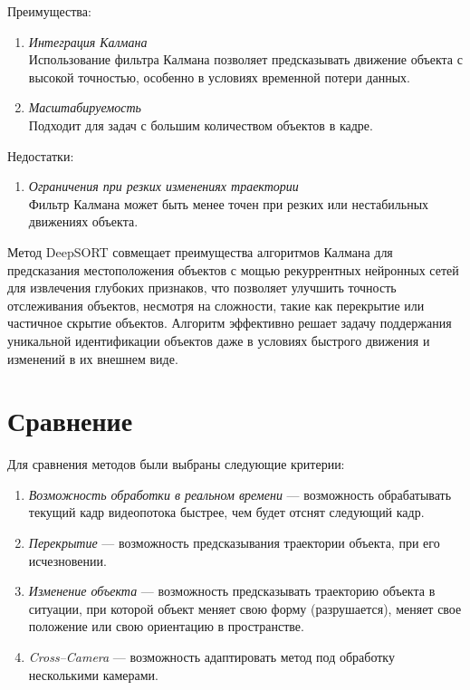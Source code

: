 Преимущества:
\begin{enumerate}
\item \textit{Интеграция Калмана} \\ Использование фильтра Калмана позволяет предсказывать движение объекта с высокой точностью, особенно в условиях временной потери данных.

\item \textit{Масштабируемость} \\ Подходит для задач с большим количеством объектов в кадре.
\end{enumerate}

Недостатки:
\begin{enumerate}
\item \textit{Ограничения при резких изменениях траектории} \\ Фильтр Калмана может быть менее точен при резких или нестабильных движениях объекта.
\end{enumerate}

Метод DeepSORT совмещает преимущества алгоритмов Калмана для предсказания местоположения объектов с мощью рекуррентных нейронных сетей для извлечения глубоких признаков, что позволяет улучшить точность отслеживания объектов, несмотря на сложности, такие как перекрытие или частичное скрытие объектов. Алгоритм эффективно решает задачу поддержания уникальной идентификации объектов даже в условиях быстрого движения и изменений в их внешнем виде.

\section{Сравнение}
Для сравнения методов были выбраны следующие критерии:
\begin{enumerate}
\item \textit{Возможность обработки в реальном времени} --- возможность обрабатывать текущий кадр видеопотока быстрее, чем будет отснят следующий кадр.

\item \textit{Перекрытие} --- возможность предсказывания траектории объекта, при его исчезновении.

\item \textit{Изменение объекта} --- возможность предсказывать траекторию объекта в ситуации, при которой объект меняет свою форму (разрушается), меняет свое положение или свою ориентацию в пространстве.

\item \textit{Cross--Camera} --- возможность адаптировать метод под обработку несколькими камерами.
\end{enumerate}

